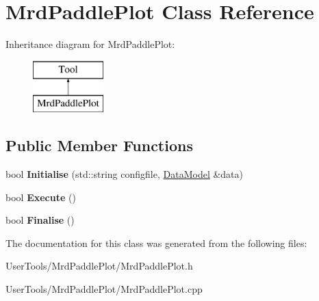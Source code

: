 \hypertarget{classMrdPaddlePlot}{\section{Mrd\-Paddle\-Plot Class Reference}
\label{classMrdPaddlePlot}
}
Inheritance diagram for Mrd\-Paddle\-Plot\-:\begin{figure}[H]
\begin{center}
\leavevmode
\includegraphics[height=2.000000cm]{classMrdPaddlePlot}
\end{center}
\end{figure}
\subsection*{Public Member Functions}
\begin{DoxyCompactItemize}
\item 
\hypertarget{classMrdPaddlePlot_a17a420342671b900521987f9dc070985}{bool {\bfseries Initialise} (std\-::string configfile, \hyperlink{classDataModel}{Data\-Model} \&data)}\label{classMrdPaddlePlot_a17a420342671b900521987f9dc070985}

\item 
\hypertarget{classMrdPaddlePlot_a655db67bffdbd48ef56a928bb84be1c2}{bool {\bfseries Execute} ()}\label{classMrdPaddlePlot_a655db67bffdbd48ef56a928bb84be1c2}

\item 
\hypertarget{classMrdPaddlePlot_ada0f5bfebebcd67b1da1f9db55fb13bc}{bool {\bfseries Finalise} ()}\label{classMrdPaddlePlot_ada0f5bfebebcd67b1da1f9db55fb13bc}

\end{DoxyCompactItemize}


The documentation for this class was generated from the following files\-:\begin{DoxyCompactItemize}
\item 
User\-Tools/\-Mrd\-Paddle\-Plot/Mrd\-Paddle\-Plot.\-h\item 
User\-Tools/\-Mrd\-Paddle\-Plot/Mrd\-Paddle\-Plot.\-cpp\end{DoxyCompactItemize}
